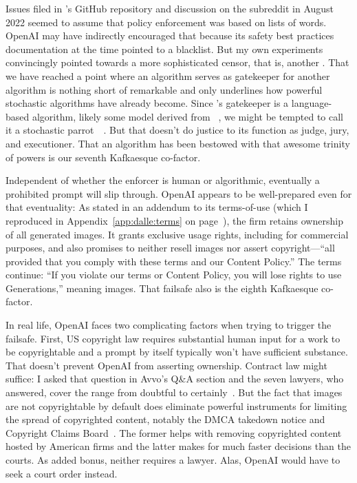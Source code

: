Issues filed in \DALLE's GitHub repository and discussion on the subreddit in
August 2022 seemed to assume that policy enforcement was based on lists of
words. OpenAI may have indirectly encouraged that because its safety best
practices documentation at the time pointed to a  blacklist. But my own
experiments convincingly pointed towards a more sophisticated censor, that is,
another . That we have reached a point where an algorithm serves as
gatekeeper for another algorithm is nothing short of remarkable and only
underlines how powerful stochastic algorithms have already become. Since
\DALLE's gatekeeper is a language-based algorithm, likely some model derived
from ~\cite{BrownMannea2020}, we might be tempted to call it a
stochastic parrot~~\cite{BenderGebruea2021}. But that doesn't do
justice to its function as judge, jury, and executioner. That an algorithm has
been bestowed with that awesome trinity of powers is our seventh Kafkaesque
co-factor.

Independent of whether the enforcer is human or algorithmic, eventually a
prohibited prompt will slip through. OpenAI appears to be well-prepared even for
that eventuality: As stated in an addendum to its terms-of-use (which I
reproduced in Appendix~\ref{app:dalle:terms} on
page~\pageref{app:dalle:terms}), the firm retains ownership of all generated
images. It grants exclusive usage rights, including for commercial purposes, and
also promises to neither resell images nor assert copyright---``all provided
that you comply with these terms and our Content Policy.'' The terms continue:
``If you violate our terms or Content Policy, you will lose rights to use
Generations,'' meaning images. That failsafe also is the eighth Kafkaesque
co-factor.

In real life, OpenAI faces two complicating factors when trying to trigger the
failsafe. First, US copyright law requires substantial human input for a work to
be copyrightable and a prompt by itself typically won't have sufficient
substance. That doesn't prevent OpenAI from asserting ownership. Contract law
might suffice: I asked that question in Avvo's Q\&A section and the seven
lawyers, who answered, cover the range from doubtful to
certainly~\cite{Grimm2023}. But the fact that images are not copyrightable by
default does eliminate powerful instruments for limiting the spread of
copyrighted content, notably the DMCA takedown notice and Copyright Claims
Board~\cite{CCB2022}. The former helps with removing copyrighted content hosted
by American firms and the latter makes for much faster decisions than the
courts. As added bonus, neither requires a lawyer. Alas, OpenAI would have to
seek a court order instead.

